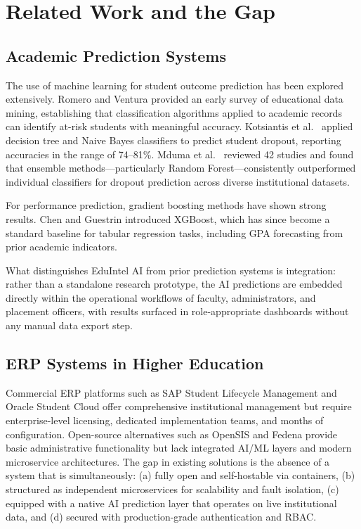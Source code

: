 \documentclass[conference]{IEEEtran}
\begin{document}
\section{Related Work and the Gap}

\subsection{Academic Prediction Systems}

The use of machine learning for student outcome prediction has been explored
extensively. Romero and Ventura \cite{romero2010} provided an early survey of
educational data mining, establishing that classification algorithms applied to
academic records can identify at-risk students with meaningful accuracy.
Kotsiantis et al.\ \cite{kotsiantis2004} applied decision tree and Naive Bayes
classifiers to predict student dropout, reporting accuracies in the range of
74--81\%. Mduma et al.\ \cite{mduma2019} reviewed 42 studies and found that
ensemble methods---particularly Random Forest---consistently outperformed
individual classifiers for dropout prediction across diverse institutional
datasets.

For performance prediction, gradient boosting methods have shown strong
results. Chen and Guestrin \cite{chen2016} introduced XGBoost, which has since
become a standard baseline for tabular regression tasks, including GPA
forecasting from prior academic indicators.

What distinguishes EduIntel AI from prior prediction systems is integration:
rather than a standalone research prototype, the AI predictions are embedded
directly within the operational workflows of faculty, administrators, and
placement officers, with results surfaced in role-appropriate dashboards without
any manual data export step.

\subsection{ERP Systems in Higher Education}

Commercial ERP platforms such as SAP Student Lifecycle Management and Oracle
Student Cloud offer comprehensive institutional management but require
enterprise-level licensing, dedicated implementation teams, and months of
configuration. Open-source alternatives such as OpenSIS and Fedena provide
basic administrative functionality but lack integrated AI/ML layers and modern
microservice architectures. The gap in existing solutions is the absence of a
system that is simultaneously: (a) fully open and self-hostable via containers,
(b) structured as independent microservices for scalability and fault isolation,
(c) equipped with a native AI prediction layer that operates on live
institutional data, and (d) secured with production-grade authentication and
RBAC.
\end{document}
